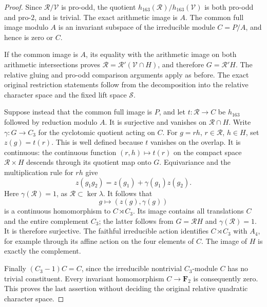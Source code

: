 \begin{proof}
Since \(\mathcal R/\mathcal V\) is pro-odd, the quotient
\(h_{163}(\mathcal R)/h_{163}(\mathcal V)\) is both pro-odd and
pro-\(2\), and is trivial.  The exact arithmetic image is \(A\).
The common full image modulo \(A\) is an invariant subspace of
the irreducible module \(C=P/A\), and hence is zero or \(C\).

If the common image is \(A\), its equality with the arithmetic
image on both arithmetic intersections proves
\(\mathcal R=\mathcal R'(\mathcal V\cap H)\), and
therefore \(G=\mathcal R'H\).  The relative gluing and pro-odd
comparison arguments apply as before.  The exact original
restriction statements follow from the decomposition into the
relative character space and the fixed lift space \(\mathcal S\).

Suppose instead that the common full image is \(P\), and let
\(t:\mathcal R\to C\) be \(h_{163}\) followed by reduction modulo
\(A\).  It is surjective and vanishes on \(\mathcal R\cap H\).
Write \(\gamma:G\to C_3\) for the cyclotomic quotient acting on
\(C\).  For \(g=rh\), \(r\in\mathcal R\), \(h\in H\), set
\(z(g)=t(r)\).  This is well defined because \(t\) vanishes on
the overlap.  It is continuous: the continuous function
\((r,h)\mapsto t(r)\) on the compact space \(\mathcal R\times H\)
descends through its quotient map onto \(G\).  Equivariance and
the multiplication rule for \(rh\) give
\[
 z(g_1g_2)=z(g_1)+\gamma(g_1)z(g_2).
\]
Here \(\gamma(\mathcal R)=1\), as \(\mathcal R\subset\ker\lambda\).
It follows that
\[
 g\longmapsto (z(g),\gamma(g))
\]
is a continuous homomorphism to \(C\rtimes C_3\).  Its image
contains all translations \(C\) and the entire complement \(C_3\);
the latter follows from \(G=\mathcal RH\) and
\(\gamma(\mathcal R)=1\).  It is therefore surjective.
The faithful irreducible action identifies
\(C\rtimes C_3\) with \(A_4\), for example through its affine
action on the four elements of \(C\).  The image of \(H\) is
exactly the complement.

Finally \((C_3-1)C=C\), since the irreducible nontrivial
\(C_3\)-module \(C\) has no trivial constituent.  Every invariant
homomorphism \(C\to\mathbf F_2\) is consequently zero.  This
proves the last assertion without deciding the original relative
quadratic character space.
\end{proof}
